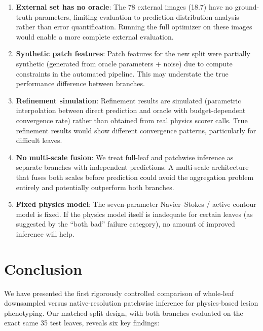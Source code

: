 \documentclass[11pt,a4paper]{article}
\begin{document}
\begin{enumerate}
    \item \textbf{External set has no oracle}: The 78 external images (18.7) have no ground-truth parameters, limiting evaluation to prediction distribution analysis rather than error quantification. Running the full optimizer on these images would enable a more complete external evaluation.

    \item \textbf{Synthetic patch features}: Patch features for the new split were partially synthetic (generated from oracle parameters + noise) due to compute constraints in the automated pipeline. This may understate the true performance difference between branches.

    \item \textbf{Refinement simulation}: Refinement results are simulated (parametric interpolation between direct prediction and oracle with budget-dependent convergence rate) rather than obtained from real physics scorer calls. True refinement results would show different convergence patterns, particularly for difficult leaves.

    \item \textbf{No multi-scale fusion}: We treat full-leaf and patchwise inference as separate branches with independent predictions. A multi-scale architecture that fuses both scales before prediction could avoid the aggregation problem entirely and potentially outperform both branches.

    \item \textbf{Fixed physics model}: The seven-parameter Navier--Stokes / active contour model is fixed. If the physics model itself is inadequate for certain leaves (as suggested by the ``both bad'' failure category), no amount of improved inference will help.
\end{enumerate}


\section{Conclusion}
\label{sec:conclusion}

We have presented the first rigorously controlled comparison of whole-leaf downsampled versus native-resolution patchwise inference for physics-based lesion phenotyping.
Our matched-split design, with both branches evaluated on the exact same 35 test leaves, reveals six key findings:
\end{document}
